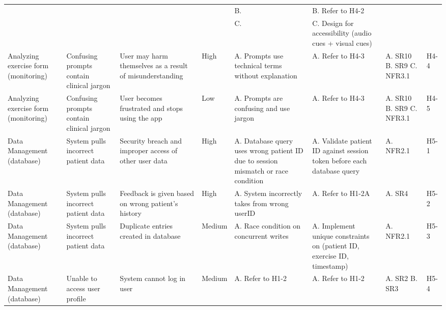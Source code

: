 \documentclass{article}
\begin{document}
\begin{landscape}
\begin{center}
\begin{xltabular}{\linewidth}{
    L{1.6cm}  
    L{1.8cm}  
    L{2cm}    
    L{0.8cm}  
    L{2cm}    
    L{2.2cm}  
    L{1.3cm}  
    L{0.8cm}  
}
& & & & 
B. & 
B. Refer to H4-2 & 
& \\

& & & & 
C. & 
C. Design for accessibility (audio cues + visual cues) & 
& \\


Analyzing exercise form (monitoring) & 
Confusing prompts contain clinical jargon & 
User may harm themselves as a result of misunderstanding & 
High & 
A. Prompts use technical terms without explanation & 
A. Refer to H4-3 & 
A. SR10 \newline
B. SR9 \newline
C. NFR3.1 & 
H4-4 \\


Analyzing exercise form (monitoring) & 
Confusing prompts contain clinical jargon & 
User becomes frustrated and stops using the app & 
Low & 
A. Prompts are confusing and use jargon & 
A. Refer to H4-3 & 
A. SR10 \newline
B. SR9 \newline
C. NFR3.1 & 
H4-5 \\


Data Management (database) & 
System pulls incorrect patient data & 
Security breach and improper access of other user data & 
High & 
A. Database query uses wrong patient ID due to session mismatch or race condition & 
A. Validate patient ID against session token before each database query & 
A. NFR2.1 & 
H5-1 \\


Data Management (database) & 
System pulls incorrect patient data & 
Feedback is given based on wrong patient's history & 
High & 
A. System incorrectly takes from wrong userID & 
A. Refer to H1-2A & 
A. SR4 & 
H5-2 \\


Data Management (database) & 
System pulls incorrect patient data & 
Duplicate entries created in database & 
Medium & 
A. Race condition on concurrent writes & 
A. Implement unique constraints on (patient ID, exercise ID, timestamp) & 
A. NFR2.1 & 
H5-3 \\


Data Management (database) & 
Unable to access user profile & 
System cannot log in user & 
Medium & 
A. Refer to H1-2 & 
A. Refer to H1-2 & 
A. SR2 \newline
B. SR3 & 
H5-4 \\

\end{xltabular}
\end{center}
\end{landscape}
\end{document}
